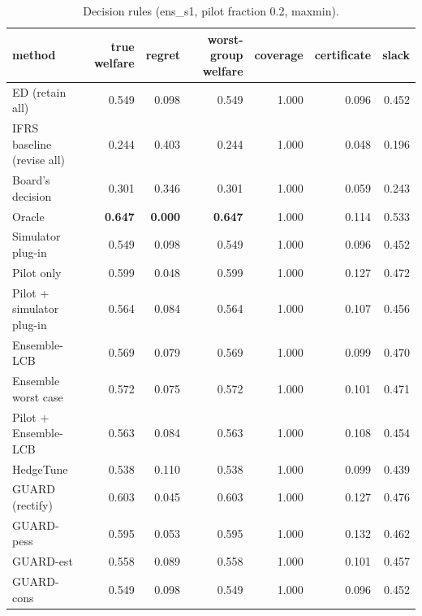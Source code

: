\begin{table}[t]
\centering
\small
\begin{tabular}{lrrrrrr}
\toprule
method & true welfare & regret & worst-group welfare & coverage & certificate & slack \\
\midrule
ED (retain all) & 0.549 & 0.098 & 0.549 & 1.000 & 0.096 & 0.452 \\
IFRS baseline (revise all) & 0.244 & 0.403 & 0.244 & 1.000 & 0.048 & 0.196 \\
Board's decision & 0.301 & 0.346 & 0.301 & 1.000 & 0.059 & 0.243 \\
Oracle & \textbf{0.647} & \textbf{0.000} & \textbf{0.647} & 1.000 & 0.114 & 0.533 \\
Simulator plug-in & 0.549 & 0.098 & 0.549 & 1.000 & 0.096 & 0.452 \\
Pilot only & 0.599 & 0.048 & 0.599 & 1.000 & 0.127 & 0.472 \\
Pilot + simulator plug-in & 0.564 & 0.084 & 0.564 & 1.000 & 0.107 & 0.456 \\
Ensemble-LCB & 0.569 & 0.079 & 0.569 & 1.000 & 0.099 & 0.470 \\
Ensemble worst case & 0.572 & 0.075 & 0.572 & 1.000 & 0.101 & 0.471 \\
Pilot + Ensemble-LCB & 0.563 & 0.084 & 0.563 & 1.000 & 0.108 & 0.454 \\
HedgeTune & 0.538 & 0.110 & 0.538 & 1.000 & 0.099 & 0.439 \\
GUARD (rectify) & 0.603 & 0.045 & 0.603 & 1.000 & 0.127 & 0.476 \\
GUARD-pess & 0.595 & 0.053 & 0.595 & 1.000 & 0.132 & 0.462 \\
GUARD-est & 0.558 & 0.089 & 0.558 & 1.000 & 0.101 & 0.457 \\
GUARD-cons & 0.549 & 0.098 & 0.549 & 1.000 & 0.096 & 0.452 \\
\bottomrule
\end{tabular}
\caption{Decision rules (ens\_s1, pilot fraction 0.2, maxmin).}
\label{tab:methods-maxmin}
\end{table}
